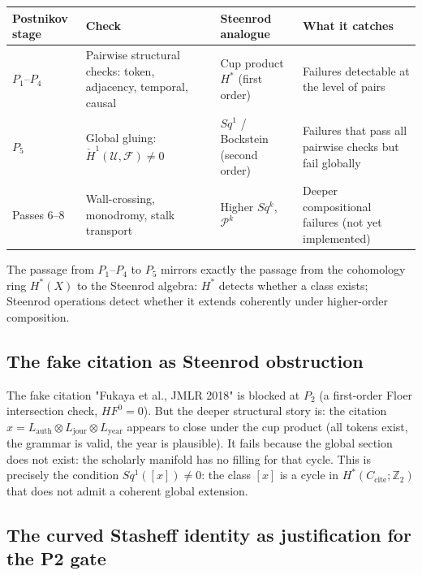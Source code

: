\documentclass[11pt,a4paper]{article}
\begin{document}
\begin{center}
\renewcommand{\arraystretch}{1.3}\small
\begin{tabularx}{\linewidth}{p{2.8cm}p{3.5cm}p{2.8cm}X}
\toprule
\textbf{Postnikov stage} & \textbf{Check} &
  \textbf{Steenrod analogue} & \textbf{What it catches} \\
\midrule
$P_1$--$P_4$ &
  Pairwise structural checks: token, adjacency, temporal, causal &
  Cup product $H^*$ (first order) &
  Failures detectable at the level of pairs \\
$P_5$ &
  Global gluing: $\check{H}^1(\mathcal{U}, \mathcal{F}) \neq 0$ &
  $Sq^1$ / Bockstein (second order) &
  Failures that pass all pairwise checks but fail globally \\
Passes 6--8 &
  Wall-crossing, monodromy, stalk transport &
  Higher $Sq^k$, $\mathcal{P}^k$ &
  Deeper compositional failures (not yet implemented) \\
\bottomrule
\end{tabularx}
\end{center}

The passage from $P_1$--$P_4$ to $P_5$ mirrors exactly the passage
from the cohomology ring $H^*(X)$ to the Steenrod algebra:
$H^*$ detects whether a class exists; Steenrod operations detect
whether it extends coherently under higher-order composition.

\subsection*{The fake citation as Steenrod obstruction}

The fake citation "Fukaya et al., JMLR 2018" is blocked at $P_2$
(a first-order Floer intersection check, $HF^0 = 0$).
But the deeper structural story is:
the citation $x = L_\text{auth} \otimes L_\text{jour} \otimes L_\text{year}$
appears to close under the cup product (all tokens exist, the grammar
is valid, the year is plausible).
It fails because the global section does not exist:
the scholarly manifold has no filling for that cycle.
This is precisely the condition $Sq^1([x]) \neq 0$: the class $[x]$
is a cycle in $H^*(C_\text{cite}; \mathbb{Z}_2)$ that does not admit
a coherent global extension.

\subsection*{The curved Stasheff identity as justification for the P2 gate}
\end{document}

